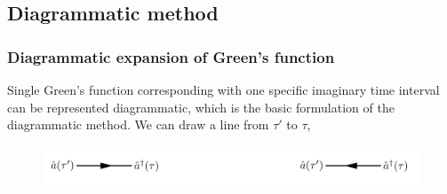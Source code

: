 \documentclass{article}[12pt]
\numberwithin{equation}{section}
\begin{document}
\subsection{Diagrammatic method}
\begin{spacing}{1.5}
\subsubsection*{Diagrammatic expansion of Green’s function}
Single Green’s function corresponding with one specific imaginary time interval can be represented diagrammatic, 
which is the basic formulation of the diagrammatic method. We can draw a line from $\tau'$ to $\tau$,
\begin{figure}[htbp]
  \centerline{\includegraphics[width=15cm]{TexFigure/Diagram_arrow.PNG}}

\end{figure}
\end{spacing}
\end{document}
